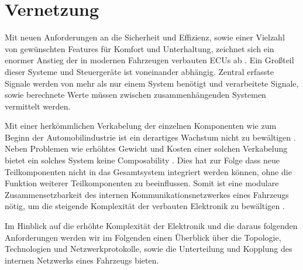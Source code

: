 \section{Vernetzung}
Mit neuen Anforderungen an die Sicherheit und Effizienz, sowie einer Vielzahl von gewünschten Features 
für Komfort und Unterhaltung, zeichnet sich ein enormer Anstieg der in modernen Fahrzeugen verbauten ECUs ab \cite{TW_kim2014gateway}.
Ein Großteil dieser Systeme und Steuergeräte ist voneinander abhängig. Zentral erfasste Signale werden von mehr als nur einem
System benötigt und verarbeitete Signale, sowie berechnete Werte müssen zwischen zusammenhängenden Systemen vermittelt werden.

Mit einer herkömmlichen Verkabelung der einzelnen Komponenten wie zum Beginn der Automobilindustrie ist ein derartiges Wachstum
nicht zu bewältigen \cite{leen1999digital}. Neben Problemen wie erhöhtes Gewicht und Kosten einer solchen Verkabelung bietet ein solches System keine
Composability \cite{reif2011bosch}. Dies hat zur Folge dass neue Teilkomponenten nicht in das Gesamtsystem integriert werden können, ohne die Funktion 
weiterer Teilkomponenten zu beeinflussen. Somit ist eine modulare Zusammensetzbarkeit des internen Kommunikationsnetzwerkes eines Fahrzeugs nötig, um die 
steigende Komplexität der verbauten Elektronik zu bewältigen \cite{reif2011bosch}.

Im Hinblick auf die erhöhte Komplexität der Elektronik und die daraus folgenden Anforderungen werden wir im Folgenden
einen Überblick über die Topologie, Technologien und Netzwerkprotokolle, sowie die Unterteilung und Kopplung des internen Netzwerks eines Fahrzeugs bieten.

